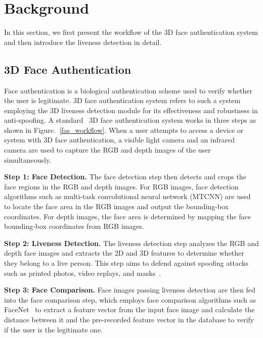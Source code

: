 \section{Background}
\label{sec:background}
In this section, we first present the workflow of the 3D face authentication system and then introduce the liveness detection in detail.

\subsection{3D Face Authentication}
Face authentication is a biological authentication scheme used to verify whether the user is legitimate. 3D face authentication system refers to such a system employing the 3D liveness detection module for its effectiveness and robustness in anti-spoofing. A standard  3D face authentication system works in three steps as shown in Figure.~\ref{fas_workflow}. When a user attempts to access a device or system with 3D face authentication, a visible light camera and an infrared camera are used to capture the RGB and depth images of the user simultaneously.

\textbf{Step 1: Face Detection.} 
The face detection step then detects and crops the face regions in the RGB and depth images. For RGB images, face detection algorithms such as multi-task convolutional neural network (MTCNN) \cite{zhang2016joint} are used to locate the face area in the RGB images and output the bounding-box coordinates. For depth images, the face area is determined by mapping the face bounding-box coordinates from RGB images.

\textbf{Step 2: Liveness Detection.} The liveness detection step analyzes the RGB and depth face images and extracts the 2D and 3D features to determine whether they belong to a live person. 
This step aims to defend against spoofing attacks such as printed photos, video replays, and masks~\cite{chakka2011competition,anjos2011counter,raghavendra2015presentation, bhattacharjee2018spoofing, nesli2013spoofing}.

\textbf{Step 3: Face Comparison.} Face images passing liveness detection are then fed into the face comparison step, which employs face comparison algorithms such as FaceNet~\cite{schroff2015facenet} to extract a feature vector from the input face image and calculate the distance between it and the pre-recorded feature vector in the database to verify if the user is the legitimate one.

